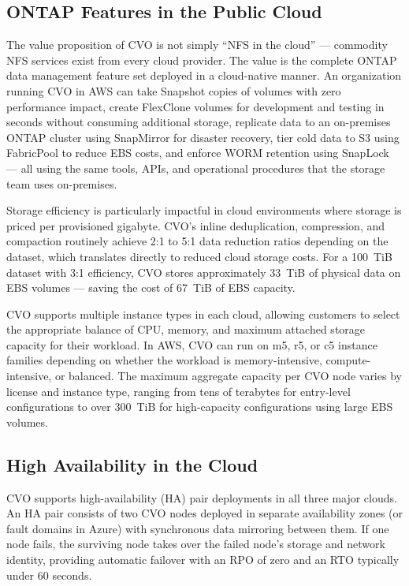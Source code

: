 \subsection{ONTAP Features in the Public Cloud}

The value proposition of CVO is not simply ``NFS in the cloud'' --- commodity
NFS services exist from every cloud provider. The value is the complete ONTAP
data management feature set deployed in a cloud-native manner. An organization
running CVO in AWS can take Snapshot copies of volumes with zero performance
impact, create FlexClone volumes for development and testing in seconds
without consuming additional storage, replicate data to an on-premises ONTAP
cluster using SnapMirror for disaster recovery, tier cold data to S3 using
FabricPool to reduce EBS costs, and enforce WORM retention using SnapLock ---
all using the same tools, APIs, and operational procedures that the storage
team uses on-premises.

Storage efficiency is particularly impactful in cloud environments where
storage is priced per provisioned gigabyte. CVO's inline deduplication,
compression, and compaction routinely achieve 2:1 to 5:1 data reduction ratios
depending on the dataset, which translates directly to reduced cloud storage
costs. For a 100~TiB dataset with 3:1 efficiency, CVO stores approximately
33~TiB of physical data on EBS volumes --- saving the cost of 67~TiB of EBS
capacity.

CVO supports multiple instance types in each cloud, allowing customers to
select the appropriate balance of CPU, memory, and maximum attached storage
capacity for their workload. In AWS, CVO can run on m5, r5, or c5 instance
families depending on whether the workload is memory-intensive,
compute-intensive, or balanced. The maximum aggregate capacity per CVO node
varies by license and instance type, ranging from tens of terabytes for
entry-level configurations to over 300~TiB for high-capacity configurations
using large EBS volumes.

\subsection{High Availability in the Cloud}

CVO supports high-availability (HA) pair deployments in all three major
clouds. An HA pair consists of two CVO nodes deployed in separate availability
zones (or fault domains in Azure) with synchronous data mirroring between
them. If one node fails, the surviving node takes over the failed node's
storage and network identity, providing automatic failover with an RPO of zero
and an RTO typically under 60 seconds.


